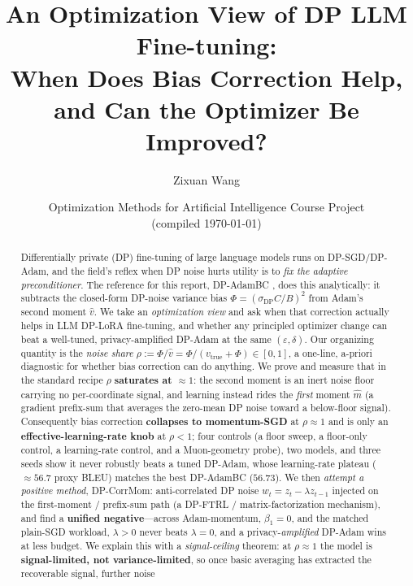 \documentclass[11pt]{article}
\title{An Optimization View of DP LLM Fine-tuning:\\
When Does Bias Correction Help, and Can the Optimizer Be Improved?}
\author{Zixuan Wang}
\date{Optimization Methods for Artificial Intelligence Course Project \\[2pt] \small (compiled \today)}
\theoremstyle{plain}
\theoremstyle{definition}
\theoremstyle{remark}
\begin{document}
\maketitle

\begin{abstract}
Differentially private (DP) fine-tuning of large language models runs on DP-SGD/DP-Adam,
and the field's reflex when DP noise hurts utility is to \emph{fix the adaptive
preconditioner}. The reference for this report, DP-AdamBC \citep{tang2024dpadambc}, does this
analytically: it subtracts the closed-form DP-noise variance bias $\Phi=(\sigma_{\mathrm{DP}}C/B)^2$
from Adam's second moment $\hat v$. We take an \emph{optimization view} and ask when that
correction actually helps in LLM DP-LoRA fine-tuning, and whether any principled optimizer
change can beat a well-tuned, privacy-amplified DP-Adam at the same $(\varepsilon,\delta)$.
Our organizing quantity is the \emph{noise share} $\rho:=\Phi/\hat v=\Phi/(v_{\mathrm{true}}+\Phi)\in[0,1]$,
a one-line, a-priori diagnostic for whether bias correction can do anything. We prove and measure
that in the standard recipe $\rho$ \textbf{saturates at $\approx 1$}: the second moment is an inert
noise floor carrying no per-coordinate signal, and learning instead rides the \emph{first} moment
$\hat m$ (a gradient prefix-sum that averages the zero-mean DP noise toward a below-floor signal).
Consequently bias correction \textbf{collapses to momentum-SGD} at $\rho\!\approx\!1$ and is only an
\textbf{effective-learning-rate knob} at $\rho\!<\!1$; four controls (a floor sweep, a floor-only
control, a learning-rate control, and a Muon-geometry probe), two models, and three seeds show it
never robustly beats a tuned DP-Adam, whose learning-rate plateau ($\approx 56.7$ proxy BLEU)
matches the best DP-AdamBC ($56.73$). We then \emph{attempt a positive method}, DP-CorrMom: anti-correlated
DP noise $w_t=z_t-\lambda z_{t-1}$ injected on the first-moment / prefix-sum path
(a DP-FTRL / matrix-factorization mechanism), and find a \textbf{unified negative}---across
Adam-momentum, $\beta_1{=}0$, and the matched plain-SGD workload, $\lambda{>}0$ never beats
$\lambda{=}0$, and a privacy-\emph{amplified} DP-Adam wins at less budget. We explain this with a
\emph{signal-ceiling} theorem: at $\rho\!\approx\!1$ the model is \textbf{signal-limited, not
variance-limited}, so once basic averaging has extracted the recoverable signal, further noise

\end{abstract}
\end{document}
